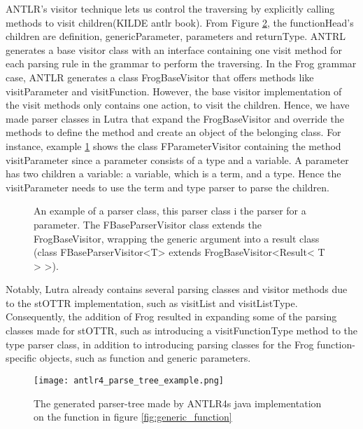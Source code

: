 \para
ANTLR's visitor technique lets us control the traversing by explicitly calling methods to visit children(KILDE antlr book). From Figure \ref{fig:parse_tree_example}, the functionHead's children are definition, genericParameter, parameters and returnType. ANTRL generates a base visitor class with an interface containing one visit method for each parsing rule in the grammar to perform the traversing. In the Frog grammar case, ANTLR generates a class FrogBaseVisitor that offers methods like visitParameter and visitFunction. However, the base visitor implementation of the visit methods only contains one action, to visit the children. Hence, we have made parser classes in Lutra that expand the FrogBaseVisitor and override the methods to define the method and create an object of the belonging class. For instance, example \ref{parameterParser} shows the class FParameterVisitor containing the method visitParameter since a parameter consists of a type and a variable. A parameter has two children a variable: a variable, which is a term, and a type. Hence the visitParameter needs to use the term and type parser to parse the children.

\begin{figure}
  \begin{example}
      \label{parameterParser}
      An example of a parser class, this parser class i the parser for a parameter. The FBaseParserVisitor class extends the FrogBaseVisitor, wrapping the generic argument into a result class (class FBaseParserVisitor<T> extends FrogBaseVisitor<Result< T > >).  
  \end{example}
  
\end{figure}

\para
Notably, Lutra already contains several parsing classes and visitor methods due to the stOTTR implementation, such as visitList and visitListType. Consequently, the addition of Frog resulted in expanding some of the parsing classes made for stOTTR, such as introducing a visitFunctionType method to the type parser class, in addition to introducing parsing classes for the Frog function-specific objects, such as function and generic parameters. 


\begin{figure}
  \centering
  \texttt{[image: antlr4\_parse\_tree\_example.png]}
  \caption{The generated parser-tree made by ANTLR4s java implementation on the function in figure \ref{fig:generic_function}}
  \label{fig:parse_tree_example}
\end{figure}

